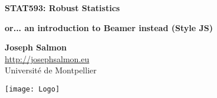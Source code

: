 \documentclass[unknownkeysallowed]{beamer}
\begin{document}



\begin{frame}
\bigskip
\bigskip
\begin{center}{
\LARGE\color{marron}
\textbf{STAT593: Robust Statistics}
\textbf{ }\\
\vspace{0.5cm}
}

\color{marron}
\textbf{or... an introduction to Beamer instead (Style JS)}
\end{center}

\vspace{0.5cm}

\begin{center}
\textbf{Joseph Salmon} \\
\vspace{0.1cm}
\url{http://josephsalmon.eu}\\
\vspace{0.5cm}
Université de Montpellier \\
\end{center}

\centering
\texttt{[image: Logo]}

\end{frame}





\end{document}

